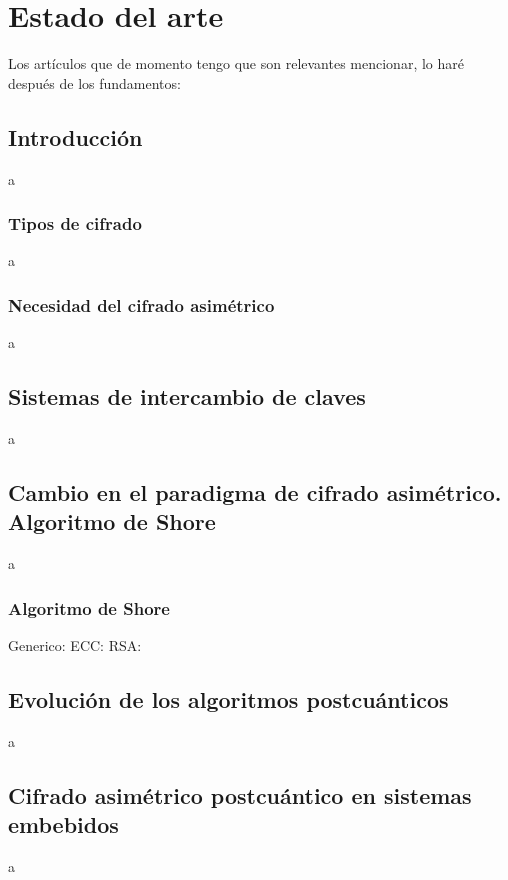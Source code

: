 \chapter{Estado del arte}
Los artículos que de momento tengo que son relevantes mencionar, lo haré después de los fundamentos:
\cite{NIST_IR_8413_2022} \cite{NIST_IR_8545_2025} \cite{011318_1_5.0179566} \cite{s11042-024-20535-x} \cite{A_COMPARATIVE_REVIEW_OF_DATA_ENCRYPTION_METHODS_IN_THE_USA_AND_EUROPE} \cite{An_Overview_and_Analysis_of_Hybrid_Encryption_The_Combination_of_Symmetric_Encryption_and_Asymmetric_Encryption} \cite{Comparative_Analysis_of_Energy_Costs_of_Asymmetric_vs_Symmetric_Encryption-Based_Security_Applications} \cite{First-Order-Masked-Kyber-on-ARM Cortex-M4} \cite{2022-414} \cite{An_overview_of_Quantum_Cryptography_and} \cite{2502.12252v1} \cite{Quantum_Resistance_Saber-Based_Group_Key_Exchange_Protocol_for_IoT} \cite{NISTFIPS203}
\section{Introducción}
a
\subsection{Tipos de cifrado}
a
\subsection{Necesidad del cifrado asimétrico}
a
\section{Sistemas de intercambio de claves}
a
\section{Cambio en el paradigma de cifrado asimétrico. Algoritmo de Shore}
a
\subsection{Algoritmo de Shore}
Generico: \cite{9508027v2} ECC: \cite{0301141v2} RSA: \cite{RESERCHFINAL}
\section{Evolución de los algoritmos postcuánticos}
a
\section{Cifrado asimétrico postcuántico en sistemas embebidos}
a